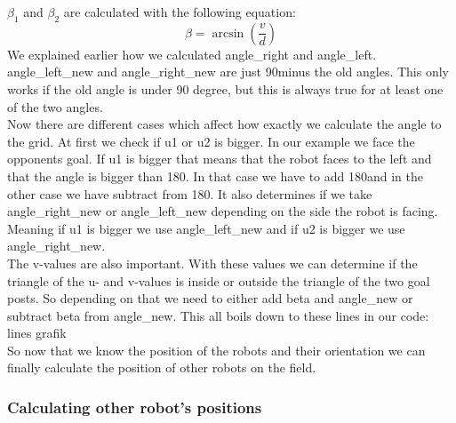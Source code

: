 \documentclass[lnicst,a4paper]{svmultln}
\begin{document}
\(\beta_{1}\) and \(\beta_{2}\) are calculated with the following equation:
\begin{equation}
	\beta = \arcsin{(\frac{v}{d})}
\end{equation}
We explained earlier how we calculated angle\_right and angle\_left. angle\_left\_new and angle\_right\_new are just 90\degree minus the old angles. 
This only works if the old angle is under 90 degree, but this is always true for at least one of the two angles.
\\
Now there are different cases which affect how exactly we calculate the angle to the grid. At first we check if u1 or u2 is bigger. In our example we face the opponents goal. If u1 is bigger that means that the robot faces to the left and that the angle is bigger than 180\degree. In that case we have to add 180\degree and in the other case we have subtract from 180\degree. It also determines if we take angle\_right\_new or angle\_left\_new depending on the side the robot is facing. Meaning if u1 is bigger we use angle\_left\_new and if u2 is bigger we use angle\_right\_new.
\\
The v-values are also important. With these values we can determine if the triangle of the u- and v-values is inside or outside the triangle of the two goal posts.
So depending on that we need to either add beta and angle\_new or subtract beta from angle\_new. This all boils down to these lines in our code:
\\
lines grafik
\\
So now that we know the position of the robots and their orientation we can finally calculate the position of other robots on the field.

\subsubsection{Calculating other robot's positions}


\end{document}
